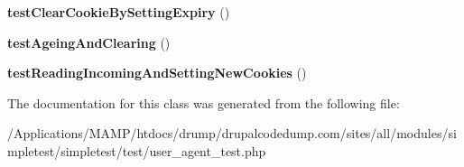 \begin{DoxyCompactItemize}
\item 
\hypertarget{class_test_of_browser_cookies_a82b17e3fe3ff1575d4ae048a1b3889d8}{
{\bfseries testClearCookieBySettingExpiry} ()}
\label{class_test_of_browser_cookies_a82b17e3fe3ff1575d4ae048a1b3889d8}

\item 
\hypertarget{class_test_of_browser_cookies_a65c6d32f63b1a960aa8638b9e4388caf}{
{\bfseries testAgeingAndClearing} ()}
\label{class_test_of_browser_cookies_a65c6d32f63b1a960aa8638b9e4388caf}

\item 
\hypertarget{class_test_of_browser_cookies_a107abaf89b3c5f2b70c70c0247c2eef0}{
{\bfseries testReadingIncomingAndSettingNewCookies} ()}
\label{class_test_of_browser_cookies_a107abaf89b3c5f2b70c70c0247c2eef0}

\end{DoxyCompactItemize}


The documentation for this class was generated from the following file:\begin{DoxyCompactItemize}
\item 
/Applications/MAMP/htdocs/drump/drupalcodedump.com/sites/all/modules/simpletest/simpletest/test/user\_\-agent\_\-test.php\end{DoxyCompactItemize}
